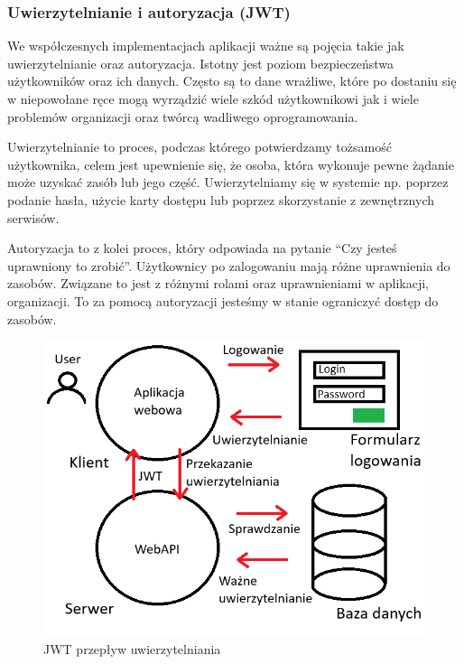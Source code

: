 \documentclass[a4paper,twoside,12pt]{book}
\begin{document}
\subsubsection{Uwierzytelnianie i autoryzacja (JWT)}
We współczesnych implementacjach aplikacji ważne są pojęcia takie jak uwierzytelnianie oraz autoryzacja. Istotny jest poziom bezpieczeństwa użytkowników oraz ich danych. Często są to dane wrażliwe, które po dostaniu się w niepowołane ręce mogą wyrządzić wiele szkód użytkownikowi jak i wiele problemów organizacji oraz twórcą wadliwego oprogramowania. 

Uwierzytelnianie to proces, podczas którego potwierdzamy tożsamość użytkownika, celem jest upewnienie się, że osoba, która wykonuje pewne żądanie może uzyskać zasób lub jego część. Uwierzytelniamy się w systemie np. poprzez podanie hasła, użycie karty dostępu lub poprzez skorzystanie z zewnętrznych serwisów. 

Autoryzacja to z kolei proces, który odpowiada na pytanie “Czy jesteś uprawniony to zrobić”. Użytkownicy po zalogowaniu mają różne uprawnienia do zasobów. Związane to jest z różnymi rolami oraz uprawnieniami w aplikacji, organizacji. To za pomocą autoryzacji jesteśmy w stanie ograniczyć dostęp do zasobów. 

\begin{figure}[H]
    \centering
    \includegraphics[width=1\textwidth]{jwt.png}
    \caption{JWT przepływ uwierzytelniania}
    \label{JWT}
\end{figure}
\end{document}
